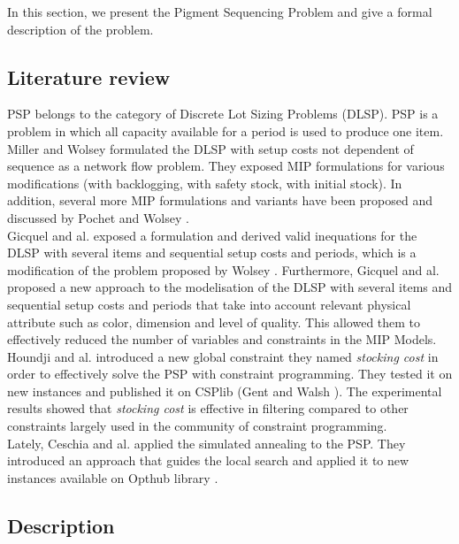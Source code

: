 \documentclass[twocolumn,10pt]{asme2ej}
\begin{document}
In this section, we present the Pigment Sequencing Problem and give a formal description of the problem.

\subsection{Literature review}

PSP belongs to the category of Discrete Lot Sizing Problems (DLSP). PSP is a problem in which all capacity available for a period is used to produce one item.\\
Miller and Wolsey \cite{miller_paper} formulated the DLSP with setup costs not dependent of sequence as a network flow problem. They exposed MIP formulations for various modifications (with backlogging, with safety stock, with initial stock). In addition, several more MIP formulations and variants have been proposed and discussed by Pochet and Wolsey \cite{wolsey_mip_paper}. \\
Gicquel and al. \cite{gicquel_paper} exposed a formulation and derived valid inequations for the DLSP with several items and sequential setup costs and periods, which is a modification of the problem proposed by Wolsey \cite{wolsey2_paper}. Furthermore, Gicquel and al. \cite{gicquel2_paper} proposed a new approach to the modelisation of the DLSP with several items and sequential setup costs and periods that take into account relevant physical attribute such as color, dimension and level of quality. This allowed them to effectively reduced the number of variables and constraints in the MIP Models.
Houndji and al. \cite{ratheil_stocking_paper} introduced a new global constraint they named \emph{stocking cost}  in order to effectively solve the PSP with constraint programming. They tested it on new instances and published it on CSPlib (Gent and Walsh \cite{gent_walsh_paper}). The experimental results showed that \emph{stocking cost} is effective in filtering compared to other constraints largely used in the community of constraint programming. \\
Lately, Ceschia and al. \cite{ceschia_sa_paper} applied the simulated annealing to the PSP. They introduced an approach that guides the local search and applied it to new instances available on  Opthub library \cite{ceschia_opthub}.  

\subsection{Description}
\end{document}
